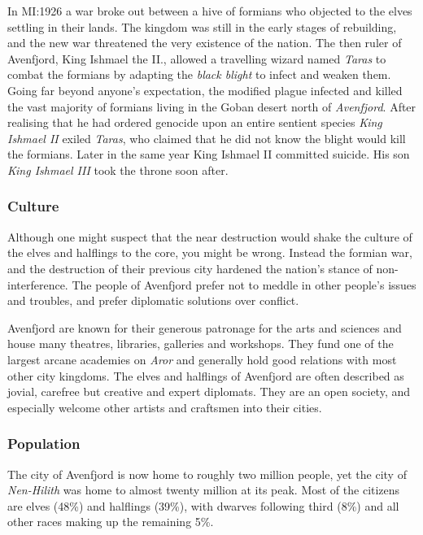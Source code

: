 In MI:1926 a war broke out between a hive of formians who objected to the
elves settling in their lands. The kingdom was still in the early stages of
rebuilding, and the new war threatened the very existence of the nation. The
then ruler of Avenfjord, King Ishmael the II., allowed a travelling wizard
named \emph{Taras} to combat the formians by adapting the \emph{black blight}
to infect and weaken them. Going far beyond anyone's expectation, the modified
plague infected and killed the vast majority of formians living in the Goban
desert north of \emph{Avenfjord}. After realising that he had ordered genocide
upon an entire sentient species \emph{King Ishmael II} exiled \emph{Taras}, who
claimed that he did not know the blight would kill the formians. Later in the
same year King Ishmael II committed suicide. His son \emph{King Ishmael III}
took the throne soon after.


\subsubsection{Culture}

Although one might suspect that the near destruction would shake the culture
of the elves and halflings to the core, you might be wrong. Instead the
formian war, and the destruction of their previous city hardened the nation's
stance of non-interference. The people of Avenfjord prefer not to meddle in
other people's issues and troubles, and prefer diplomatic solutions over
conflict.

Avenfjord are known for their generous patronage for the arts and sciences and
house many theatres, libraries, galleries and workshops. They fund one of the
largest arcane academies on \emph{Aror} and generally hold good relations with
most other city kingdoms. The elves and halflings of Avenfjord are often
described as jovial, carefree but creative and expert diplomats. They are an
open society, and especially welcome other artists and craftsmen into their
cities.

\subsubsection{Population}

The city of Avenfjord is now home to roughly two million people, yet the city
of \emph{Nen-Hilith} was home to almost twenty million at its peak. Most of
the citizens are elves (48\%) and halflings (39\%), with dwarves following
third (8\%) and all other races making up the remaining 5\%.

